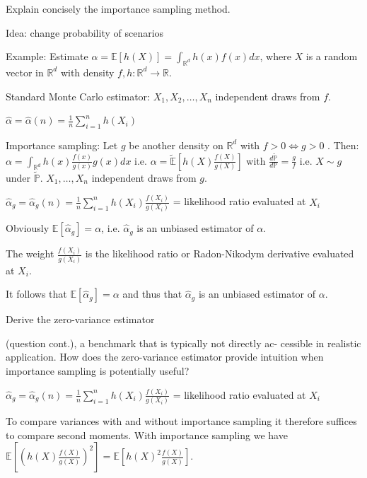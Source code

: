Explain concisely the importance sampling method.

Idea: change probability of scenarios

Example: Estimate \( \alpha = \mathbb{E}[h(X)] = \int_{\mathbb{R}^d} h(x)f(x) dx \),
where \( X \) is a random vector in \( \mathbb{R}^d \) with density \( f, h: \mathbb{R}^d \rightarrow \mathbb{R} \).

Standard Monte Carlo estimator: \( X_1, X_2, \dots, X_n \) independent draws from \( f \).

\( \hat{\alpha} = \hat{\alpha}(n) = \frac{1}{n} \sum_{i=1}^{n} h(X_i) \)

Importance sampling: Let \( g \) be another density on \( \mathbb{R}^d \) with \( f > 0 \iff g > 0\) . Then:
\( \alpha = \int_{\mathbb{R}^d} h(x) \frac{f(x)}{g(x)} g(x) dx \) i.e.
\( \alpha = \tilde{\mathbb{E}} \left[ h(X) \frac{f(X)}{g(X)} \right] \) with \( \frac{d \tilde{\mathbb{P}}}{d \mathbb{P}} = \frac{g}{f} \)
i.e. \( X \sim g \) under \( \tilde{\mathbb{P}} \).
\( X_1, \dots, X_n \) independent draws from \( g \).

\( \hat{\alpha}_g = \hat{\alpha}_g(n) = \frac{1}{n} \sum_{i=1}^{n} h(X_i) \frac{f(X_i)}{g(X_i)} \) = likelihood ratio evaluated at \( X_i \)

Obviously \( \mathbb{E} [\hat{\alpha}_g] = \alpha \), i.e. \( \hat{\alpha}_g \) is an unbiased estimator of \( \alpha \).

The weight \( \frac{f(X_i)}{g(X_i)} \) is the likelihood ratio or Radon-Nikodym derivative
evaluated at \( X_i \).

It follows that \( \mathbb{E}[\hat{\alpha}_g] = \alpha \) and thus that \( \hat{\alpha}_g \) is an unbiased
estimator of \( \alpha \).

Derive the zero-variance estimator

(question cont.), a benchmark that is typically not directly ac-
cessible in realistic application. How does the zero-variance estimator provide
intuition when importance sampling is potentially useful?

\( \hat{\alpha}_g = \hat{\alpha}_g(n) = \frac{1}{n} \sum_{i=1}^{n} h(X_i) \frac{f(X_i)}{g(X_i)} \) = likelihood ratio evaluated at \( X_i \)

To compare variances with and without importance sampling
it therefore suffices to compare second moments. With importance sampling
we have \( \mathbb{E} \left[ \left( h(X) \frac{f(X)}{g(X)} \right)^2 \right] = \mathbb{E} \left[ h(X)^2 \frac{f(X)}{g(X)} \right] \).

